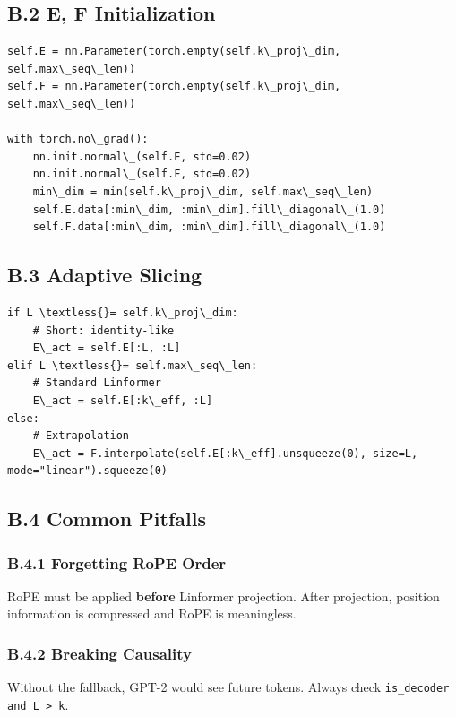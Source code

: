 \subsection{B.2 E, F Initialization}

\begin{lstlisting}
self.E = nn.Parameter(torch.empty(self.k\_proj\_dim, self.max\_seq\_len))
self.F = nn.Parameter(torch.empty(self.k\_proj\_dim, self.max\_seq\_len))

with torch.no\_grad():
    nn.init.normal\_(self.E, std=0.02)
    nn.init.normal\_(self.F, std=0.02)
    min\_dim = min(self.k\_proj\_dim, self.max\_seq\_len)
    self.E.data[:min\_dim, :min\_dim].fill\_diagonal\_(1.0)
    self.F.data[:min\_dim, :min\_dim].fill\_diagonal\_(1.0)
\end{lstlisting}

\subsection{B.3 Adaptive Slicing}

\begin{lstlisting}
if L \textless{}= self.k\_proj\_dim:
    # Short: identity-like
    E\_act = self.E[:L, :L]
elif L \textless{}= self.max\_seq\_len:
    # Standard Linformer
    E\_act = self.E[:k\_eff, :L]
else:
    # Extrapolation
    E\_act = F.interpolate(self.E[:k\_eff].unsqueeze(0), size=L, mode="linear").squeeze(0)
\end{lstlisting}

\subsection{B.4 Common Pitfalls}

\subsubsection{B.4.1 Forgetting RoPE Order}

RoPE must be applied \textbf{before} Linformer projection. After projection, 
position information is compressed and RoPE is meaningless.

\subsubsection{B.4.2 Breaking Causality}

Without the fallback, GPT-2 would see future tokens. Always check 
\texttt{is\_decoder and L \textgreater{} k}.

